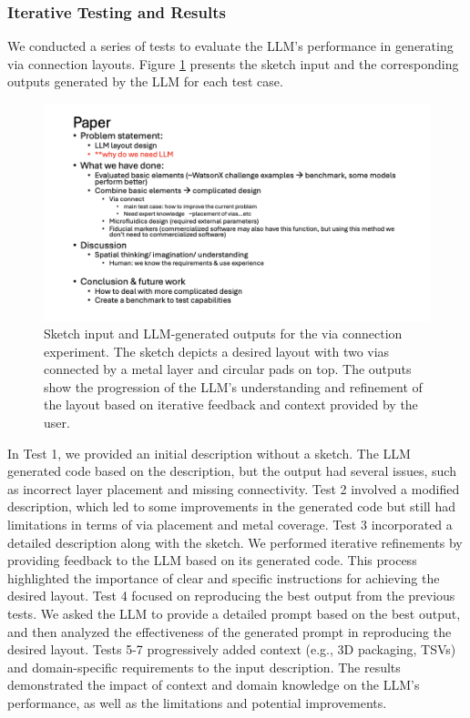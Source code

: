 \documentclass{article}
\begin{document}
\subsubsection{Iterative Testing and Results}
We conducted a series of tests to evaluate the LLM's performance in generating via connection layouts. Figure \ref{fig:via_experiment} presents the sketch input and the corresponding outputs generated by the LLM for each test case.
\begin{figure}[!h]
\centering
\includegraphics[width=\linewidth]{via_experiment.png}
\caption{Sketch input and LLM-generated outputs for the via connection experiment. The sketch depicts a desired layout with two vias connected by a metal layer and circular pads on top. The outputs show the progression of the LLM's understanding and refinement of the layout based on iterative feedback and context provided by the user.}
\label{fig:via_experiment}
\end{figure}
In Test 1, we provided an initial description without a sketch. The LLM generated code based on the description, but the output had several issues, such as incorrect layer placement and missing connectivity. Test 2 involved a modified description, which led to some improvements in the generated code but still had limitations in terms of via placement and metal coverage.
Test 3 incorporated a detailed description along with the sketch. We performed iterative refinements by providing feedback to the LLM based on its generated code. This process highlighted the importance of clear and specific instructions for achieving the desired layout.
Test 4 focused on reproducing the best output from the previous tests. We asked the LLM to provide a detailed prompt based on the best output, and then analyzed the effectiveness of the generated prompt in reproducing the desired layout.
Tests 5-7 progressively added context (e.g., 3D packaging, TSVs) and domain-specific requirements to the input description. The results demonstrated the impact of context and domain knowledge on the LLM's performance, as well as the limitations and potential improvements.
\end{document}
